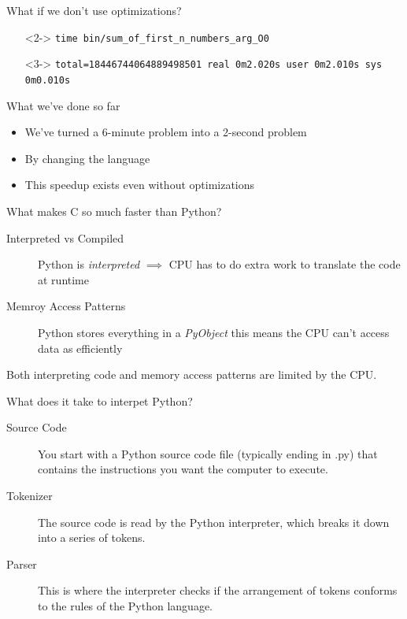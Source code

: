 \documentclass[12pt, aspectration=169]{beamer}
\begin{document}
    \begin{frame}{What if we don't use optimizations?}
        \begin{itemize}
            \item[]<2-> \texttt{time bin/sum\_of\_first\_n\_numbers\_arg\_O0\newline}
            \item[]<3-> \texttt{total=18446744064889498501\newline
            real 0m2.020s\newline
            user 0m2.010s\newline
            sys 0m0.010s\newline}
        \end{itemize}
    \end{frame}

    \begin{frame}{What we've done so far}
        \begin{itemize}
            \item We've turned a 6-minute problem into a 2-second problem
            \item By changing the language
            \item This speedup exists even without optimizations
        \end{itemize}
    \end{frame}

    \begin{frame}{What makes C so much faster than Python?}
        \begin{description}
            \item[Interpreted vs Compiled] Python is \textit{interpreted} $\implies$ CPU has to do extra work to translate the code at runtime
            \item[Memroy Access Patterns] Python stores everything in a \textit{PyObject} this means the CPU can't access data as efficiently
        \end{description}
        Both interpreting code and memory access patterns are limited by the CPU.
    \end{frame}

    \begin{frame}{What does it take to interpet Python?}
        \begin{description}
            \item[Source Code] You start with a Python source code file (typically ending in .py) that contains the instructions you want the computer to execute.
            \item[Tokenizer] The source code is read by the Python interpreter, which breaks it down into a series of tokens.
            \item[Parser] This is where the interpreter checks if the arrangement of tokens conforms to the rules of the Python language.
        \end{description}
    \end{frame}
\end{document}
